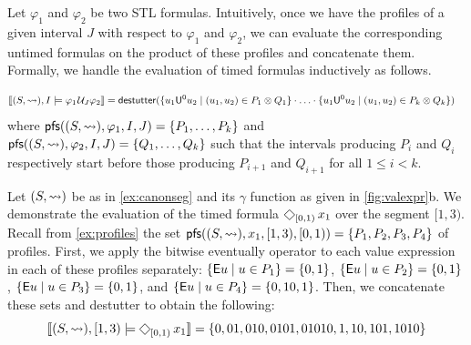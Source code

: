 Let $\varphi_1$ and $\varphi_2$ be two STL formulas.
Intuitively, once we have the profiles of a given interval $J$ with respect to $\varphi_1$ and $\varphi_2$, we can evaluate the corresponding untimed formulas on the product of these profiles and concatenate them.
Formally, we handle the evaluation of timed formulas inductively as follows.

\scriptsize
\begin{align*}
	\llbracket (S, {\hb}), I \models \varphi_1 \until_J \varphi_2 \rrbracket &= \destutter( \{ u_1 \mathsf{U}^0 u_2 \st (u_1, u_2) \in P_1 \otimes Q_1 \} \cdot \ldots \cdot \{ u_1 \mathsf{U}^0 u_2 \st (u_1, u_2) \in P_k \otimes Q_k \} )
\end{align*}
\normalsize
where $\mathsf{pfs}((S,{\rightsquigarrow}), \varphi_1, I, J) = \{P_1, \ldots, P_k \}$ and $\mathsf{pfs}((S,{\rightsquigarrow}), \varphi_2, I, J) = \{Q_1, \ldots, Q_k \}$ such that the intervals producing $P_i$ and $Q_i$ respectively start before those producing $P_{i+1}$ and $Q_{i+1}$ for all $1 \leq i < k$.



\begin{example} \label{ex:timed}
	Let $(S, {\rightsquigarrow})$ be as in \cref{ex:canonseg} and its $\gamma$ function as given in \cref{fig:valexpr}b.
	We demonstrate the evaluation of the timed formula $\LTLeventually_{[0,1)} x_1$ over the segment $[1,3)$.
	Recall from \cref{ex:profiles} the set $\mathsf{pfs}((S,{\rightsquigarrow}), x_1, [1,3), [0,1)) = \{P_1, P_2, P_3, P_4\}$ of profiles.
	First, we apply the bitwise eventually operator to each value expression in each of these profiles separately:
	$\{ \mathsf{E} u \st u \in P_1 \} = \{ 0, 1 \}$, $\{ \mathsf{E} u \st u \in P_2 \} = \{ 0, 1 \}$, $\{ \mathsf{E} u \st u \in P_3 \} = \{ 0, 1 \}$, and $\{ \mathsf{E} u \st u \in P_4 \} = \{ 0, 10, 1 \}$.
	Then, we concatenate these sets and destutter to obtain the following:
	\[ 	\llbracket (S, {\hb}), [1,3) \models \LTLeventually_{[0,1)} x_1 \rrbracket = \{ 0, 01, 010, 0101, 01010, 1, 10, 101, 1010 \}  \]
\end{example}

